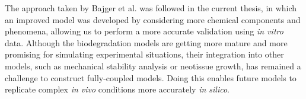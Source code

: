The approach taken by Bajger et al. was followed in the current thesis, in which an improved model was developed by considering more chemical components and phenomena, allowing us to perform a more accurate validation using \textit{in vitro} data. Although the biodegradation models are getting more mature and more promising for simulating experimental situations, their integration into other models, such as mechanical stability analysis or neotissue growth, has remained a challenge to construct fully-coupled models. Doing this enables future models to replicate complex \textit{in vivo} conditions more accurately \textit{in silico}.


%




\cleardoublepage



